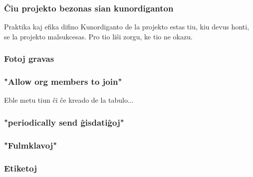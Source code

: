 \documentclass{beamer}
\begin{document}
  \begin{frame}
    \frametitle{Ĉiu projekto bezonas sian kunordiganton}

	\begin{block}{Praktika kaj efika difino}
		Kunordiganto de la projekto estas tiu, kiu devus honti, se la projekto malsukcesas. Pro tio liŝi zorgu, ke tio ne okazu.
	\end{block}
	    
  \end{frame}


  \begin{frame}
    \frametitle{Fotoj gravas}

  \end{frame}


  \begin{frame}
    \frametitle{"Allow org members to join"}

    Eble metu tiun ĉi ĉe kreado de la tabulo...
  \end{frame}


  \begin{frame}
    \frametitle{"periodically send ĝisdatiĝoj"}

  \end{frame}


  \begin{frame}
    \frametitle{"Fulmklavoj"}

  \end{frame}


  \begin{frame}
    \frametitle{Etiketoj}

  \end{frame}
\end{document}
